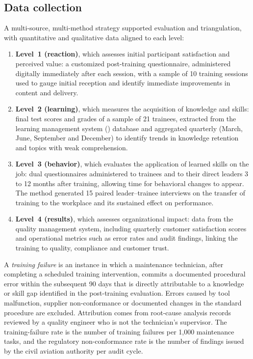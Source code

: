 \subsection{Data collection}
\label{subsec:data}

A multi-source, multi-method strategy supported evaluation and triangulation, with quantitative and qualitative data aligned to each level:

\begin{enumerate}[label=(\alph*)]
  \item \textbf{Level~1 (reaction)}, which assesses initial participant satisfaction and perceived value: a customized post-training questionnaire, administered digitally immediately after each session, with a sample of 10 training sessions used to gauge initial reception and identify immediate improvements in content and delivery.
  \item \textbf{Level~2 (learning)}, which measures the acquisition of knowledge and skills: final test scores and grades of a sample of 21 trainees, extracted from the learning management system (\LMS{}) database and aggregated quarterly (March, June, September and December) to identify trends in knowledge retention and topics with weak comprehension.
  \item \textbf{Level~3 (behavior)}, which evaluates the application of learned skills on the job: dual questionnaires administered to trainees and to their direct leaders 3 to 12 months after training, allowing time for behavioral changes to appear. The method generated 15 paired leader--trainee interviews on the transfer of training to the workplace and its sustained effect on performance.
  \item \textbf{Level~4 (results)}, which assesses organizational impact: data from the quality management system, including quarterly customer satisfaction scores and operational metrics such as error rates and audit findings, linking the training to quality, compliance and customer trust.
\end{enumerate}


A \textit{training failure} is an instance in which a maintenance technician, after completing a scheduled training intervention, commits a documented procedural error within the subsequent 90 days that is directly attributable to a knowledge or skill gap identified in the post-training evaluation. Errors caused by tool malfunction, supplier non-conformance or documented changes in the standard procedure are excluded. Attribution comes from root-cause analysis records reviewed by a quality engineer who is not the technician's supervisor. The training-failure rate is the number of training failures per 1,000 maintenance tasks, and the regulatory non-conformance rate is the number of findings issued by the civil aviation authority per audit cycle. 

